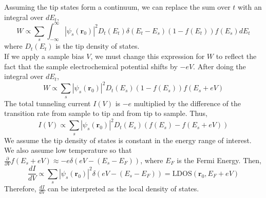 \documentclass[a4paper,12pt]{article}
\renewcommand{\vec}[1]{\boldsymbol{\mathbf{#1}}}
\begin{document}
Assuming the tip states form a continuum, we can replace the sum over $t$ with an integral over $dE_t$,
\begin{equation}
W \propto \sum_s \int_{-\infty}^{\infty} | \psi_s(\vec{r}_0) |^2 D_t(E_t) \delta(E_t-E_s) (1-f(E_t)) f(E_s) dE_t
\end{equation}
where $D_t(E_t)$ is the tip density of states. \\
If we apply a sample bias $V$, we must change this expression for $W$ to reflect the fact that the sample electrochemical potential shifts by $-eV$.  After doing the integral over $dE_t$,
\begin{equation}
W \propto \sum_s | \psi_s(\vec{r}_0) |^2 D_t(E_s) (1-f(E_s)) f(E_s+eV)
\end{equation}
The total tunneling current $I(V)$ is $-e$ multiplied by the difference of the transition rate from sample to tip and from tip to sample.  Thus,
\begin{equation}
I(V) \propto \sum_s | \psi_s(\vec{r}_0) |^2 D_t(E_s) (f(E_s)-f(E_s+eV))
\end{equation}
We assume the tip density of states is constant in the energy range of interest.  We also assume low temperature so that $\frac{\partial}{\partial V} f(E_s+eV) \approx -e \delta(eV-(E_s-E_F))$, where $E_F$ is the Fermi Energy.  Then,
\begin{equation}
\frac{dI}{dV} \propto \sum_s | \psi_s(\vec{r}_0) |^2 \delta(eV-(E_s-E_F)) = \text{LDOS}(\vec{r}_0,E_F+eV)
\end{equation}
Therefore, $\frac{dI}{dV}$ can be interpreted as the local density of states.
\end{document}
